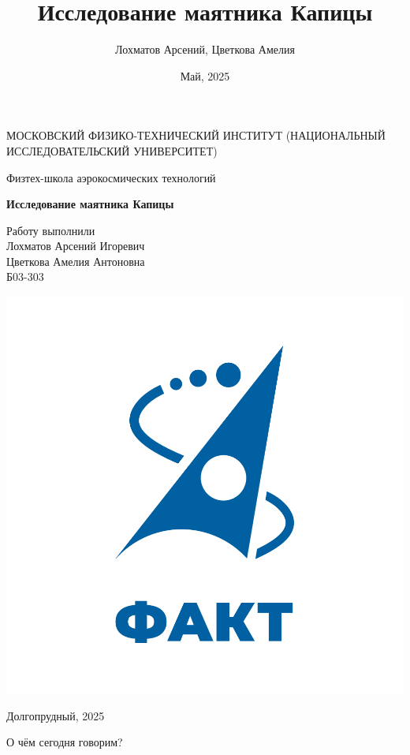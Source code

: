 \documentclass{beamer}
\title{Исследование маятника Капицы}
\author{Лохматов Арсений, Цветкова Амелия}
\date{Май, 2025}
\begin{document}
\begin{frame}
    \begin{center}
    {\small МОСКОВСКИЙ ФИЗИКО-ТЕХНИЧЕСКИЙ ИНСТИТУТ (НАЦИОНАЛЬНЫЙ ИССЛЕДОВАТЕЛЬСКИЙ УНИВЕРСИТЕТ)}

    {Физтех-школа аэрокосмических технологий}
    \end{center}


    \begin{center}
    {\color{mipt-blue}\bfseries \Large Исследование маятника Капицы}
    \linebreak
    \end{center}
    
    \begin{flushright}
                       {\small Работу выполнили\\
                       Лохматов Арсений Игоревич\\
                       Цветкова Амелия Антоновна\\
                       Б03-303 }
    \end{flushright}

    \vspace{\fill}

    \begin{center}
        \includegraphics[width=0.15\linewidth]{dasr.png}
    \end{center}

    \begin{center}
    \tiny Долгопрудный, 2025
    \end{center}
\end{frame}

\begin{frame}{О чём сегодня говорим?}
    \tableofcontents
\end{frame}
\end{document}
